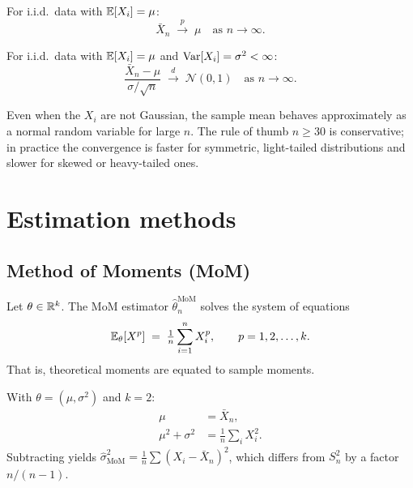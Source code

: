 \begin{thbox}
\label{th:lln}
For i.i.d.\ data with $\mathbb{E}[X_i] = \mu$:
\[
  \bar{X}_n \;\xrightarrow{p}\; \mu \quad \text{as } n \to \infty.
\]
\end{thbox}

\begin{thbox}
\label{th:clt}
For i.i.d.\ data with $\mathbb{E}[X_i] = \mu$ and $\mathrm{Var}[X_i] = \sigma^2 < \infty$:
\[
  \frac{\bar{X}_n - \mu}{\sigma / \sqrt{n}}
  \;\xrightarrow{d}\;
  \mathcal{N}(0, 1) \quad \text{as } n \to \infty.
\]
\end{thbox}

\begin{rembox}
Even when the $X_i$ are not Gaussian, the sample mean behaves
approximately as a normal random variable for large $n$. The rule of
thumb $n \geq 30$ is conservative; in practice the convergence is
faster for symmetric, light-tailed distributions and slower for skewed
or heavy-tailed ones.
\end{rembox}

\section{Estimation methods}
\label{sec:estimation}

\subsection{Method of Moments (MoM)}

\begin{defbox}
\label{def:mom}
Let $\theta \in \mathbb{R}^k$. The MoM estimator $\widehat{\theta}_n^{\text{MoM}}$
solves the system of equations
\[
  \mathbb{E}_\theta[X^p] \;=\; \tfrac{1}{n}\sum_{i=1}^{n} X_i^p,
  \qquad p = 1, 2, \dots, k.
\]
That is, theoretical moments are equated to sample moments.
\end{defbox}

\begin{exbox}
With $\theta = (\mu, \sigma^2)$ and $k = 2$:
\begin{align*}
  \mu        &= \bar{X}_n, \\
  \mu^2 + \sigma^2 &= \tfrac{1}{n}\sum_i X_i^2.
\end{align*}
Subtracting yields
$\widehat{\sigma}^2_{\text{MoM}} = \tfrac{1}{n}\sum(X_i - \bar{X}_n)^2$,
which differs from $S_n^2$ by a factor $n / (n - 1)$.
\end{exbox}

